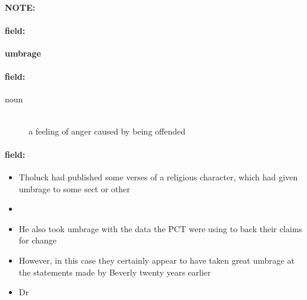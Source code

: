 \documentclass[12pt]{article}
\newenvironment{note}{\paragraph{NOTE:}}{}
\newenvironment{field}{\paragraph{field:}}{}
\begin{document}
\begin{note}
\begin{field}
\textbf{\large umbrage}
\end{field}


\begin{field}
\begin{description}
\item[noun] \hfill \\ 
a feeling of anger caused by being offended

\end{description}
\end{field}

\begin{field}
\begin{itemize}
\item  Tholuck had published some verses of a religious character, which had given umbrage to some sect or other
\item 
\item He also took umbrage with the data the PCT were using to back their claims for change
\item However, in this case they certainly appear to have taken great umbrage at the statements made by Beverly twenty years earlier
\item Dr
\end{itemize}
\end{field}
\end{note}
\end{document}
